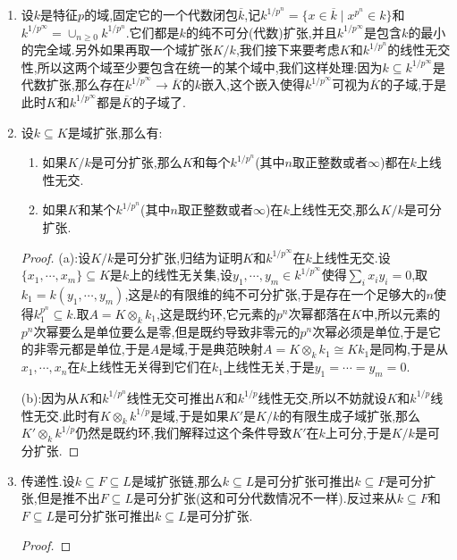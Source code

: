 \begin{enumerate}
\begin{proof}
		特征零的时候域扩张总是可分扩张.下面设$k$是特征$p>0$的完全域,于是$k=k^{1/p}$,于是上一条说明对任意域扩张$K/k$,它的每个有限生成子域扩张都是可分的,于是它本身是可分扩张.接下来如果$k$代数$A$是可分的,那么当然$A=A\otimes_kk$本身是既约的,反过来如果$k$代数$A$是既约的,不妨设它是有限生成代数,那么$A$是诺特环,它的全商环是有限个域的直积(既约诺特环的全商环是有限个域的直积),记作$K=K_1\times\cdots\times K_r$,因为$k$是完全域,每个$K_i$都在$k$上可分,于是$K$也是可分的(环上代数的张量和有限直积可交换,既约环的有限直积是既约的),于是它的子环$A$也是可分的.
	\end{proof}
	\item 设$k$是特征$p$的域,固定它的一个代数闭包$\overline{k}$,记$k^{1/p^n}=\{x\in\overline{k}\mid x^{p^n}\in k\}$和$k^{1/p^{\infty}}=\cup_{n\ge0}k^{1/p^n}$.它们都是$k$的纯不可分(代数)扩张,并且$k^{1/p^{\infty}}$是包含$k$的最小的完全域.另外如果再取一个域扩张$K/k$,我们接下来要考虑$K$和$k^{1/p^n}$的线性无交性,所以这两个域至少要包含在统一的某个域中,我们这样处理:因为$k\subseteq k^{1/p^{\infty}}$是代数扩张,那么存在$k^{1/p^{\infty}}\to\overline{K}$的$k$嵌入,这个嵌入使得$k^{1/p^{\infty}}$可视为$\overline{K}$的子域,于是此时$K$和$k^{1/p^{\infty}}$都是$\overline{K}$的子域了.
	\item 设$k\subseteq K$是域扩张,那么有:
	\begin{enumerate}
		\item 如果$K/k$是可分扩张,那么$K$和每个$k^{1/p^n}$(其中$n$取正整数或者$\infty$)都在$k$上线性无交.
		\item 如果$K$和某个$k^{1/p^n}$(其中$n$取正整数或者$\infty$)在$k$上线性无交,那么$K/k$是可分扩张.
	\end{enumerate}
	\begin{proof}
		
		(a):设$K/k$是可分扩张,归结为证明$K$和$k^{1/p^{\infty}}$在$k$上线性无交.设$\{x_1,\cdots,x_m\}\subseteq K$是$k$上的线性无关集,设$y_1,\cdots,y_m\in k^{1/p^{\infty}}$使得$\sum_ix_iy_i=0$,取$k_1=k(y_1,\cdots,y_m)$,这是$k$的有限维的纯不可分扩张,于是存在一个足够大的$n$使得$k_1^{p^n}\subseteq k$.取$A=K\otimes_kk_1$,这是既约环,它元素的$p^n$次幂都落在$K$中,所以元素的$p^n$次幂要么是单位要么是零,但是既约导致非零元的$p^n$次幂必须是单位,于是它的非零元都是单位,于是$A$是域,于是典范映射$A=K\otimes_kk_1\cong Kk_1$是同构,于是从$x_1,\cdots,x_n$在$k$上线性无关得到它们在$k_1$上线性无关,于是$y_1=\cdots=y_m=0$.
		
		\qquad
		
		(b):因为从$K$和$k^{1/p^n}$线性无交可推出$K$和$k^{1/p}$线性无交,所以不妨就设$K$和$k^{1/p}$线性无交.此时有$K\otimes_kk^{1/p}$是域,于是如果$K'$是$K/k$的有限生成子域扩张,那么$K'\otimes_kk^{1/p}$仍然是既约环,我们解释过这个条件导致$K'$在$k$上可分,于是$K/k$是可分扩张.
	\end{proof}
	\item 传递性.设$k\subseteq F\subseteq L$是域扩张链,那么$k\subseteq L$是可分扩张可推出$k\subseteq F$是可分扩张,但是推不出$F\subseteq L$是可分扩张(这和可分代数情况不一样).反过来从$k\subseteq F$和$F\subseteq L$是可分扩张可推出$k\subseteq L$是可分扩张.
	\begin{proof}
		

\end{proof}
\end{enumerate}
